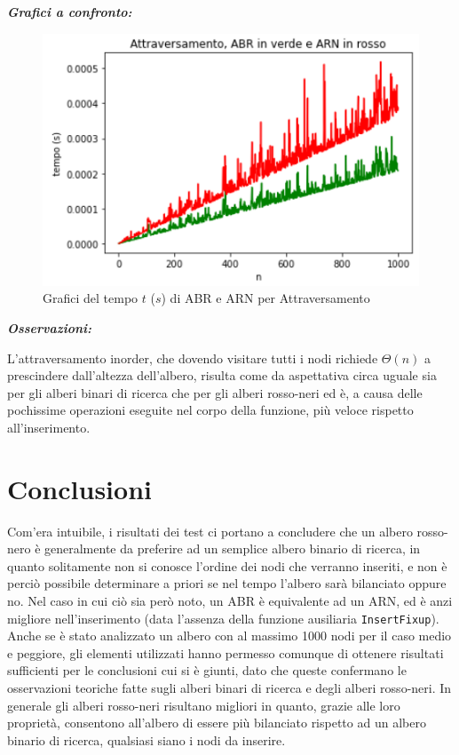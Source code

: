 \documentclass[]{article}
\def\code#1{\texttt{#1}} %
\begin{document}
\noindent \textit{\bf{Grafici a confronto:}} 
\begin{figure}[ht]
\centering
\includegraphics[width=.7\textwidth, height=.6\textheight, keepaspectratio]{GraficoAttraversamento}
\vspace{-5mm}
\caption{Grafici del tempo $t$ ($s$) di ABR e ARN per Attraversamento}
\label{fig:fig10}
\end{figure}

\noindent \textit{\bf{Osservazioni:}}

L'attraversamento inorder, che dovendo visitare tutti i nodi richiede $\Theta(n)$ a prescindere dall'altezza dell'albero, risulta come da aspettativa circa uguale sia per gli alberi binari di ricerca che per gli alberi rosso-neri ed è, a causa delle pochissime operazioni eseguite nel corpo della funzione, più veloce rispetto all'inserimento.


\section {Conclusioni}

Com'era intuibile, i risultati dei test ci portano a concludere che un albero rosso-nero è generalmente da preferire ad un semplice albero binario di ricerca, in quanto solitamente non si conosce l'ordine dei nodi che verranno  inseriti, e non è perciò possibile determinare a priori se nel tempo l'albero sarà bilanciato oppure no. Nel caso in cui ciò sia però noto, un ABR è equivalente ad un ARN, ed è anzi migliore nell'inserimento (data l'assenza della funzione ausiliaria \code{InsertFixup}). Anche se è stato analizzato un albero con al massimo 1000 nodi per il caso medio e peggiore, gli elementi utilizzati hanno permesso comunque di ottenere risultati sufficienti per le conclusioni cui si è giunti, dato che queste confermano le osservazioni teoriche fatte sugli alberi binari di ricerca e degli alberi rosso-neri.
In generale gli alberi rosso-neri risultano migliori in quanto, grazie alle loro proprietà, consentono all'albero di essere più bilanciato rispetto ad un albero binario di ricerca, qualsiasi siano i nodi da inserire.
\end{document}
